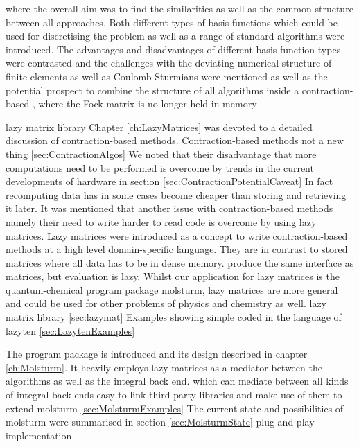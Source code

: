 where the overall aim was to find the similarities as well as the common
structure between all approaches.
Both different types of basis functions which could be used
for discretising the \HF problem as well as
a range of standard \SCF algorithms were introduced.
The advantages and disadvantages of different basis function
types were contrasted
and the challenges with the deviating numerical structure
of finite elements as well as Coulomb-Sturmians
were mentioned
as well as the potential prospect to combine the structure
of all \SCF algorithms
inside a contraction-based \SCF,
where the Fock matrix is no longer held in memory




\lazyten lazy matrix library
Chapter \ref{ch:LazyMatrices} was devoted to a detailed discussion
of contraction-based methods.
Contraction-based methods not a new thing \vref{sec:ContractionAlgos}
We noted that their disadvantage that more computations
need to be performed is overcome by trends in the current developments
of hardware
in section \vref{sec:ContractionPotentialCaveat}
In fact recomputing data has in some cases become cheaper than storing
and retrieving it later.
It was mentioned that another issue with contraction-based methods
namely their need to write harder to read code
is overcome by using lazy matrices.
Lazy matrices were introduced as a concept to write contraction-based
methods at a high level domain-specific language.
They are in contrast to stored matrices where all data has to be in dense memory.
produce the same interface as matrices,
but evaluation is lazy.
Whilst our application for lazy matrices is the quantum-chemical
program package molsturm,
lazy matrices are more general and could be used for other problems
of physics and chemistry as well.
lazy matrix library \lazyten \vref{sec:lazymat}
Examples showing simple \SCF coded in the language of lazyten \vref{sec:LazytenExamples}

The program package \molsturm is introduced and its design described
in chapter \vref{ch:Molsturm}.
It heavily employs lazy matrices as a mediator between
the \SCF algorithms as well as the integral back end.
which can mediate between all kinds of integral back ends
%
easy to link third party libraries and make use of them
to extend molsturm
\vref{sec:MolsturmExamples}
The current state and possibilities of molsturm
were summarised in section \vref{sec:MolsturmState}
plug-and-play implementation

